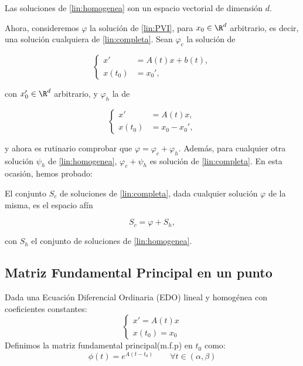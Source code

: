 \begin{ncor}
  Las soluciones de \eqref{lin:homogenea} son un espacio vectorial de dimensión $d$.
\end{ncor}

Ahora, consideremos $\varphi$ la solución de \eqref{lin:PVI}, para $x_0\in\R^d$ arbitrario, es decir, una solución cualquiera de \eqref{lin:completa}.
Sean $\varphi_c$ la solución de

\begin{equation}
\left\{\begin{array}{rl}
x' &=A(t)x+b(t), \\
x(t_0)&=x_0',
\end{array}\right.
\end{equation}

con $x_0'\in\R^d$ arbitrario, y $\varphi_h$ la de

\begin{equation}
\left\{\begin{array}{rl}
x' &=A(t)x, \\
x(t_0)&=x_0 - x_0',
\end{array}\right.
\end{equation}

y ahora es rutinario comprobar que $\varphi = \varphi_c + \varphi_h$. Además, para cualquier otra solución $\psi_{h}$ de \eqref{lin:homogenea}, $\varphi_c + \psi_h$
es solución de \eqref{lin:completa}.
En esta ocasión, hemos probado:

\begin{ncor}
  El conjunto $S_c$ de soluciones de \eqref{lin:completa}, dada cualquier solución $\varphi$ de la misma, es el espacio afín

  \[
    S_c = \varphi + S_h,
    \]

    con $S_h$ el conjunto de soluciones de \eqref{lin:homogenea}.
\end{ncor}

\subsection{Matriz Fundamental Principal en un punto}
\begin{ndef}
Dada una Ecuación Diferencial Ordinaria (EDO) lineal y homogénea con coeficientes constantes:
\[
\begin{cases}
x'=A(t)x\\
x(t_0)=x_0
\end{cases}
\]
Definimos la matriz fundamental principal(m.f.p) en $t_0$ como: $$ \phi(t)=e^{A(t-t_0)} \qquad \forall t \in (\alpha,\beta)$$
\end{ndef}

